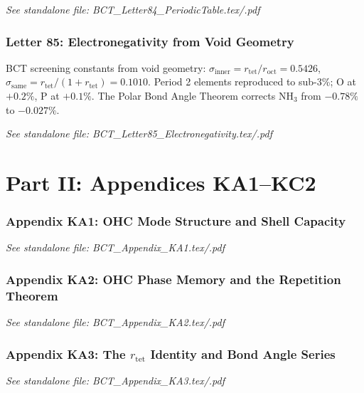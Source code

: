 \documentclass[aps,preprint,superscriptaddress,floatfix]{revtex4-2}
\begin{document}
\textit{See standalone file: BCT\_Letter84\_PeriodicTable.tex/.pdf}

\newpage
\section*{Letter 85: Electronegativity from Void Geometry}

BCT screening constants from void geometry:
$\sigma_\mathrm{inner} = r_\mathrm{tet}/r_\mathrm{oct} = 0.5426$,
$\sigma_\mathrm{same} = r_\mathrm{tet}/(1+r_\mathrm{tet}) = 0.1010$.
Period 2 elements reproduced to sub-3\%; O at $+0.2\%$,
P at $+0.1\%$. The Polar Bond Angle Theorem corrects NH$_3$
from $-0.78\%$ to $-0.027\%$.

\textit{See standalone file: BCT\_Letter85\_Electronegativity.tex/.pdf}


\newpage
\part*{Part II: Appendices KA1--KC2}

\newpage
\section*{Appendix KA1: OHC Mode Structure and Shell Capacity}
\textit{See standalone file: BCT\_Appendix\_KA1.tex/.pdf}

\newpage
\section*{Appendix KA2: OHC Phase Memory and the Repetition Theorem}
\textit{See standalone file: BCT\_Appendix\_KA2.tex/.pdf}

\newpage
\section*{Appendix KA3: The $r_\mathrm{tet}$ Identity and Bond Angle Series}
\textit{See standalone file: BCT\_Appendix\_KA3.tex/.pdf}
\end{document}
